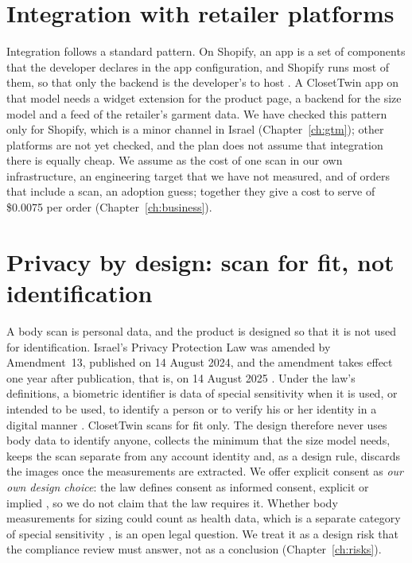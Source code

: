 \section{Integration with retailer platforms}\label{sec:product-integration}

Integration follows a standard pattern. On Shopify, an app is a set of components that the developer declares in the app configuration, and Shopify runs most of them, so that only the backend is the developer's to host \cite{shopify_dev_build}. A ClosetTwin app on that model needs a widget extension for the product page, a backend for the size model and a feed of the retailer's garment data. We have checked this pattern only for Shopify, which is a minor channel in Israel (Chapter~\ref{ch:gtm}); other platforms are not yet checked, and the plan does not assume that integration there is equally cheap. We assume  as the cost of one scan in our own infrastructure, an engineering target that we have not measured, and  of orders that include a scan, an adoption guess; together they give a cost to serve of \$0.0075 per order (Chapter~\ref{ch:business}).

\section{Privacy by design: scan for fit, not identification}\label{sec:privacy-design}

A body scan is personal data, and the product is designed so that it is not used for identification. Israel's Privacy Protection Law was amended by Amendment~13, published on 14 August 2024, and the amendment takes effect one year after publication, that is, on 14 August 2025 \cite{il_amend13_2024}. Under the law's definitions, a biometric identifier is data of special sensitivity when it is used, or intended to be used, to identify a person or to verify his or her identity in a digital manner \cite{il_amend13_2024,il_ppl_en}. ClosetTwin scans for fit only. The design therefore never uses body data to identify anyone, collects the minimum that the size model needs, keeps the scan separate from any account identity and, as a design rule, discards the images once the measurements are extracted. We offer explicit consent as \emph{our own design choice}: the law defines consent as informed consent, explicit or implied \cite{il_ppl_en}, so we do not claim that the law requires it. Whether body measurements for sizing could count as health data, which is a separate category of special sensitivity \cite{il_ppl_en}, is an open legal question. We treat it as a design risk that the compliance review must answer, not as a conclusion (Chapter~\ref{ch:risks}).

